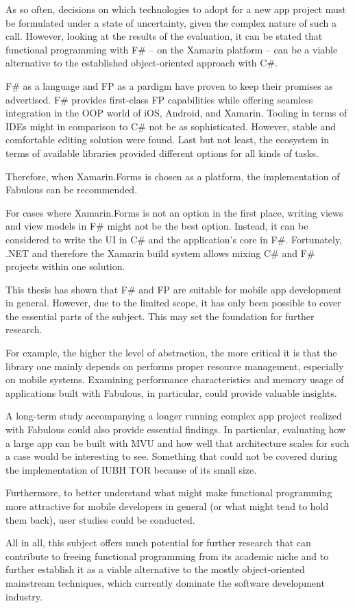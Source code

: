 As so often, decisions on which technologies to adopt for a new app project must be formulated under a state of uncertainty, given the complex nature of such a call. However, looking at the results of the evaluation, it can be stated that functional programming with F\# – on the Xamarin platform – can be a viable alternative to the established object-oriented approach with C\#.

F\# as a language and FP as a pardigm have proven to keep their promises as advertised. F\# provides first-class FP capabilities while offering seamless integration in the OOP world of iOS, Android, and Xamarin. Tooling in terms of IDEs might in comparison to C\# not be as sophisticated. However, stable and comfortable editing solution were found. Last but not least, the ecosystem in terms of available libraries provided different options for all kinds of tasks. 

Therefore, when Xamarin.Forms is chosen as a platform, the implementation of Fabulous can be recommended. 

For cases where Xamarin.Forms is not an option in the first place, writing views and view models in F\# might not be the best option. Instead, it can be considered to write the UI in C\# and the application's core in F\#. Fortunately, .NET and therefore the Xamarin build system allows mixing C\# and F\# projects within one solution.

This thesis has shown that F\# and FP are suitable for mobile app development in general. However, due to the limited scope, it has only been possible to cover the essential parts of the subject. This may set the foundation for further research.

For example, the higher the level of abstraction, the more critical it is that the library one mainly depends on performs proper resource management, especially on mobile systems. Examining performance characteristics and memory usage of applications built with Fabulous, in particular, could provide valuable insights.

A long-term study accompanying a longer running complex app project realized with Fabulous could also provide essential findings. In particular, evaluating how a large app can be built with MVU and how well that architecture scales for such a case would be interesting to see. Something that could not be covered during the implementation of IUBH TOR because of its small size.

Furthermore, to better understand what might make functional programming more attractive for mobile developers in general (or what might tend to hold them back), user studies could be conducted.

All in all, this subject offers much potential for further research that can contribute to freeing functional programming from its academic niche and to further establish it as a viable alternative to the mostly object-oriented mainstream techniques, which currently dominate the software development industry.
